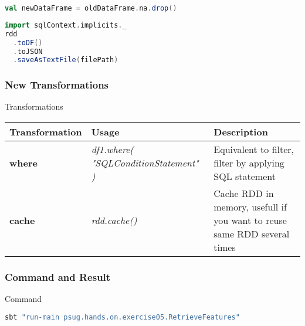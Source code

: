 \documentclass[slidetop,9pt,utf8]{beamer}
\begin{document}
\begin{CJK}{UTF8}{gbsn}
\begin{frame}[fragile]
  \begin{lstlisting}[label=DropNullValue, caption=Drop rows containing null values, language=scala, style=code]
val newDataFrame = oldDataFrame.na.drop()
  \end{lstlisting}

  \begin{lstlisting}[label=SaveJsonFile, caption=Save RDD to JSON File, language=scala, style=code]
import sqlContext.implicits._
rdd
  .toDF()
  .toJSON
  .saveAsTextFile(filePath)
  \end{lstlisting}

\end{frame}

\begin{frame}

  \frametitle{New Transformations}

  \begin{block}{Transformations}
    \begin{center}
      \begin{tabular}{|m{2.1cm}|m{3.5cm}|m{5cm}|}
        \hline 
        \rowcolor{gray} \textbf{Transformation} & \textbf{Usage} & \textbf{Description} \\ \hline
        \textbf{where} & \textit{df1.where( \newline  "SQLConditionStatement" \newline )} & Equivalent to filter, filter by applying SQL statement \\ \hline
        \textbf{cache} & \textit{rdd.cache()} & Cache RDD in memory, usefull if you want to reuse same RDD several times \\ \hline
      \end{tabular}
    \end{center}
  \end{block}

\end{frame}

\begin{frame}[fragile]
  \frametitle{Command and Result}

  \begin{block}{Command}
    \begin{lstlisting}[language=bash, style=terminal]
sbt "run-main psug.hands.on.exercise05.RetrieveFeatures"
    \end{lstlisting}
  \end{block}


\end{frame}
\end{CJK}
\end{document}

